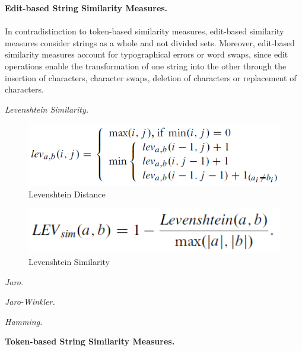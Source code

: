 \textbf{Edit-based String Similarity Measures.} \\
\\
In contradistinction to token-based similarity measures, edit-based similarity measures consider strings as a whole and not divided sets. Moreover, edit-based similarity measures account for typographical errors or word swaps, since edit operations enable the transformation of one string into the other through the insertion of characters, character swaps, deletion of characters or replacement of characters.

\textit{Levenshtein Similarity.}

\begin{figure}
	\begin{center}
	\includegraphics[width=13cm]{./figures/LevenshteinDistance.PNG}
	\caption[Levenshtein Distance]{Levenshtein Distance \cite{VassilisChristophides2015EntityRI-P25-28}}
	\label{fig:Levenshtein Distance}
	\end{center}
\end{figure}

\begin{figure}
	\begin{center}
	\includegraphics[width=13cm]{./figures/LevenshteinSimilarity.PNG}
	\caption[Levenshtein Similarity]{Levenshtein Similarity \cite{VassilisChristophides2015EntityRI-P25-28}}
	\label{fig:Levenshtein Similarity}
	\end{center}
\end{figure}

\textit{Jaro.}

\textit{Jaro-Winkler.}

\textit{Hamming.}

\textbf{Token-based String Similarity Measures.}


